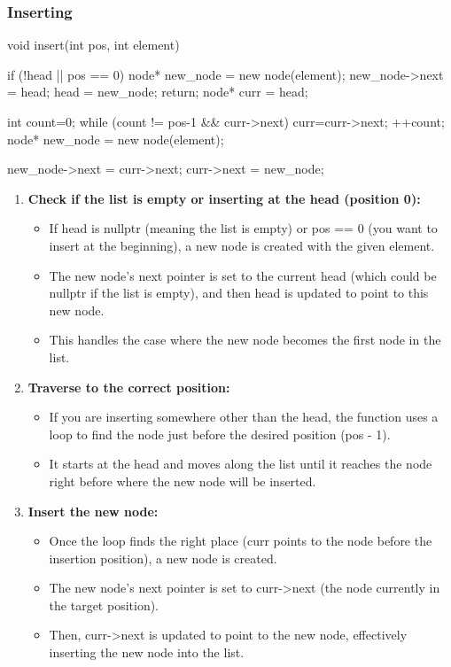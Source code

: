 \documentclass{report}
\begin{document}
    \subsubsection{Inserting}
    \bigbreak \noindent 
    \begin{cppcode}
        void insert(int pos, int element) {
            if (!head || pos == 0) {
                node* new_node = new node(element);
                new_node->next = head;
                head = new_node;
                return;
            }
            node* curr = head;

            int count=0;
            while (count != pos-1 && curr->next) {
                curr=curr->next;
                ++count;
            }
            node* new_node = new node(element);

            new_node->next = curr->next;
            curr->next = new_node;
        }
    \end{cppcode}
    \bigbreak \noindent 
    \begin{enumerate}
        \item \textbf{Check if the list is empty or inserting at the head (position 0):}
            \begin{itemize}
                \item If head is nullptr (meaning the list is empty) or pos == 0 (you want to insert at the beginning), a new node is created with the given element.
                \item The new node's next pointer is set to the current head (which could be nullptr if the list is empty), and then head is updated to point to this new node.
                \item This handles the case where the new node becomes the first node in the list.
            \end{itemize}
        \item \textbf{Traverse to the correct position:}
            \begin{itemize}
                \item If you are inserting somewhere other than the head, the function uses a loop to find the node just before the desired position (pos - 1).
                \item It starts at the head and moves along the list until it reaches the node right before where the new node will be inserted.
            \end{itemize}
        \item \textbf{Insert the new node:}
            \begin{itemize}
                \item Once the loop finds the right place (curr points to the node before the insertion position), a new node is created.
                \item The new node’s next pointer is set to curr->next (the node currently in the target position).
                \item Then, curr->next is updated to point to the new node, effectively inserting the new node into the list.
            \end{itemize}

    \end{enumerate}
\end{document}

